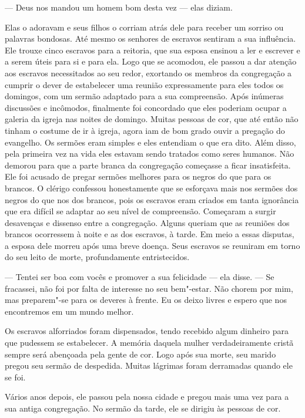 --- Deus nos mandou um homem bom desta vez --- elas diziam.

Elas o adoravam e seus filhos o corriam atrás dele para receber um
sorriso ou palavras bondosas. Até mesmo os senhores de escravos sentiram
a sua influência. Ele trouxe cinco escravos para a reitoria, que sua
esposa ensinou a ler e escrever e a serem úteis para si e para ela. Logo
que se acomodou, ele passou a dar atenção aos escravos necessitados ao
seu redor, exortando os membros da congregação a cumprir o dever de
estabelecer uma reunião expressamente para eles todos os domingos, com
um sermão adaptado para a sua compreensão. Após inúmeras discussões e
incômodos, finalmente foi concordado que eles poderiam ocupar a galeria
da igreja nas noites de domingo. Muitas pessoas de cor, que até então
não tinham o costume de ir à igreja, agora iam de bom grado ouvir a
pregação do evangelho. Os sermões eram simples e eles entendiam o que
era dito. Além disso, pela primeira vez na vida eles estavam sendo
tratados como seres humanos. Não demorou para que a parte branca da
congregação começasse a ficar insatisfeita. Ele foi acusado de pregar
sermões melhores para os negros do que para os brancos. O clérigo
confessou honestamente que se esforçava mais nos sermões dos negros do
que nos dos brancos, pois os escravos eram criados em tanta ignorância
que era difícil se adaptar ao seu nível de compreensão. Começaram a
surgir desavenças e dissenso entre a congregação. Alguns queriam que as
reuniões dos brancos ocorressem à noite e as dos escravos, à tarde. Em
meio a essas disputas, a esposa dele morreu após uma breve doença. Seus
escravos se reuniram em torno do seu leito de morte, profundamente
entristecidos.

--- Tentei ser boa com vocês e promover a sua felicidade --- ela disse.
--- Se fracassei, não foi por falta de interesse no seu bem"-estar. Não
chorem por mim, mas preparem"-se para os deveres à frente. Eu os deixo
livres e espero que nos encontremos em um mundo melhor.

Os escravos alforriados foram dispensados, tendo recebido algum dinheiro
para que pudessem se estabelecer. A memória daquela mulher
verdadeiramente cristã sempre será abençoada pela gente de cor. Logo
após sua morte, seu marido pregou seu sermão de despedida. Muitas
lágrimas foram derramadas quando ele se foi.

Vários anos depois, ele passou pela
nossa cidade e pregou mais uma vez para a sua antiga congregação. No
sermão da tarde, ele se dirigiu às pessoas de cor.

